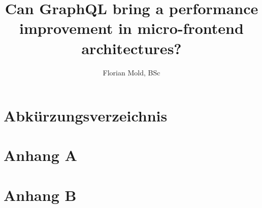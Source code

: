 \documentclass[MSE,Master,english]{twbook}%
\title{Can GraphQL bring a performance improvement in micro-frontend architectures?}
\author{Florian Mold, BSc}
\providecommand\listacroname{}
\renewcommand\listacroname{List of Abbreviations}
\renewcommand\listacroname{Abkürzungsverzeichnis}
\begin{document}
\maketitle












\chapter*{\listacroname}
\begin{acronym}[XXXXX]
\end{acronym}

%
%
\clearpage
\appendix
\chapter{Anhang A}
\clearpage
\chapter{Anhang B}
\end{document}

